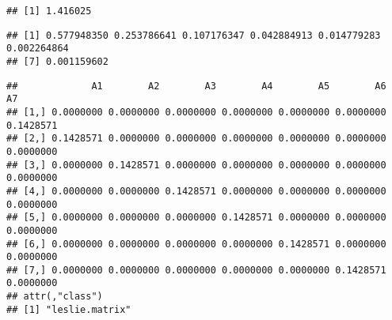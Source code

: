\documentclass[]{article}
\newenvironment{Shaded}{\begin{snugshade}}{\end{snugshade}}
\newcommand{\CommentTok}[1]{\textcolor[rgb]{0.56,0.35,0.01}{\textit{#1}}}
\newcommand{\OperatorTok}[1]{\textcolor[rgb]{0.81,0.36,0.00}{\textbf{#1}}}
\newcommand{\NormalTok}[1]{#1}
\begin{document}
\begin{verbatim}
## [1] 1.416025
\end{verbatim}

\begin{Shaded}
\end{Shaded}

\begin{verbatim}
## [1] 0.577948350 0.253786641 0.107176347 0.042884913 0.014779283 0.002264864
## [7] 0.001159602
\end{verbatim}

\begin{Shaded}
\end{Shaded}

\begin{verbatim}
##             A1        A2        A3        A4        A5        A6        A7
## [1,] 0.0000000 0.0000000 0.0000000 0.0000000 0.0000000 0.0000000 0.1428571
## [2,] 0.1428571 0.0000000 0.0000000 0.0000000 0.0000000 0.0000000 0.0000000
## [3,] 0.0000000 0.1428571 0.0000000 0.0000000 0.0000000 0.0000000 0.0000000
## [4,] 0.0000000 0.0000000 0.1428571 0.0000000 0.0000000 0.0000000 0.0000000
## [5,] 0.0000000 0.0000000 0.0000000 0.1428571 0.0000000 0.0000000 0.0000000
## [6,] 0.0000000 0.0000000 0.0000000 0.0000000 0.1428571 0.0000000 0.0000000
## [7,] 0.0000000 0.0000000 0.0000000 0.0000000 0.0000000 0.1428571 0.0000000
## attr(,"class")
## [1] "leslie.matrix"
\end{verbatim}
\end{document}
